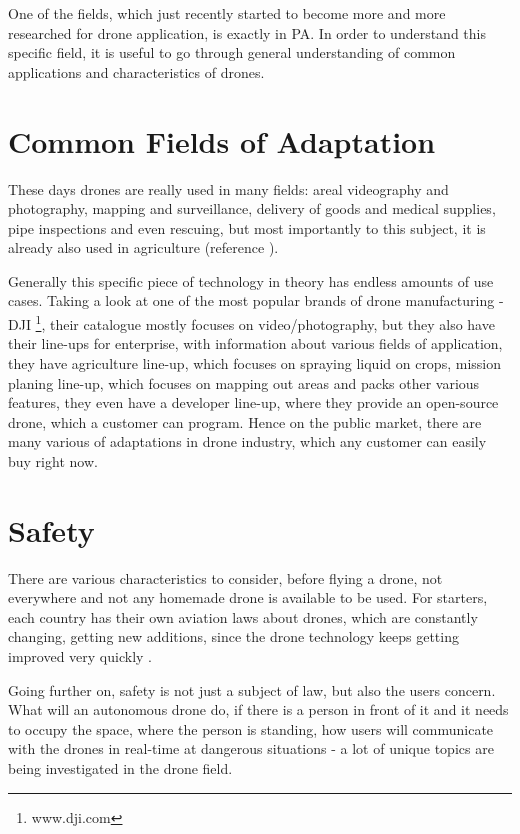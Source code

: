 \documentclass[11pt,a4paper,footinclude=true,headinclude=true, oneside]{scrbook}
\begin{document}
One of the fields, which just recently started to become more and more researched for drone application, is exactly in PA. In order to understand this specific field, it is useful to go through general understanding of common applications and characteristics of drones.

\section{Common Fields of Adaptation}

These days drones are really used in many fields: areal videography and photography, mapping and surveillance, delivery of goods and medical supplies, pipe inspections and even rescuing, but most importantly to this subject, it is already also used in agriculture (reference \cite{alwateer_enabling_2019}). 

Generally this specific piece of technology in theory has endless amounts of use cases. Taking a look at one of the most popular brands of drone manufacturing - DJI \footnote{www.dji.com}, their catalogue mostly focuses on video/photography, but they also have their line-ups for enterprise, with information about various fields of application, they have agriculture line-up, which focuses on spraying liquid on crops, mission planing line-up, which focuses on mapping out areas and packs other various features, they even have a developer line-up, where they provide an open-source drone, which a customer can program. Hence on the public market, there are many various of adaptations in drone industry, which any customer can easily buy right now.

\section{Safety}

There are various characteristics to consider, before flying a drone, not everywhere and not any homemade drone is available to be used. For starters, each country has their own aviation laws about drones, which are constantly changing, getting new additions, since the drone technology keeps getting improved very quickly \cite{alamouri_exploratory_2021}. 

Going further on, safety is not just a subject of law, but also the users concern. What will an autonomous drone do, if there is a person in front of it and it needs to occupy the space, where the person is standing, how users will communicate with the drones in real-time at dangerous situations \cite{doran_conceptual_2020} - a lot of unique topics are being investigated in the drone field.
\end{document}
